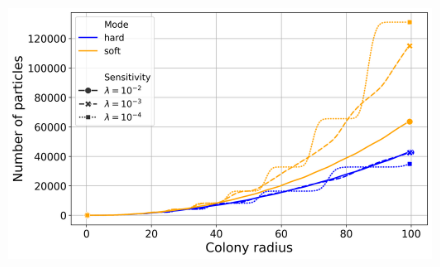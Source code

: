 \documentclass[conference]{IEEEtran}
\begin{document}
\begin{figure}[h]
    \centering
    \includegraphics[width=\linewidth]{figures/comparison_plots/combined_colony_radius_vs_num_particles.png}
    \caption{ }
\end{figure}

\newpage
\end{document}
